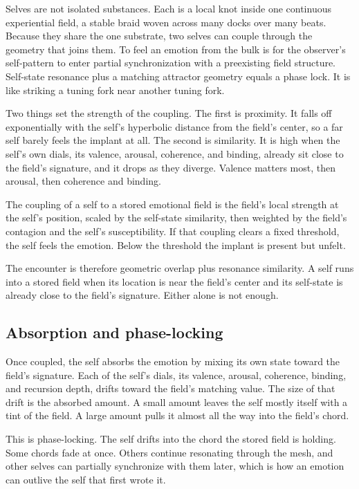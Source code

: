 Selves are not isolated substances. Each is a local knot inside one continuous experiential field, a stable braid woven across many docks over many beats. Because they share the one substrate, two selves can couple through the geometry that joins them. To feel an emotion from the bulk is for the observer's self-pattern to enter partial synchronization with a preexisting field structure. Self-state resonance plus a matching attractor geometry equals a phase lock. It is like striking a tuning fork near another tuning fork.

Two things set the strength of the coupling. The first is proximity. It falls off exponentially with the self's hyperbolic distance from the field's center, so a far self barely feels the implant at all. The second is similarity. It is high when the self's own dials, its valence, arousal, coherence, and binding, already sit close to the field's signature, and it drops as they diverge. Valence matters most, then arousal, then coherence and binding.

\begin{definition}
The coupling of a self to a stored emotional field is the field's local strength at the self's position, scaled by the self-state similarity, then weighted by the field's contagion and the self's susceptibility. If that coupling clears a fixed threshold, the self feels the emotion. Below the threshold the implant is present but unfelt.
\end{definition}

The encounter is therefore geometric overlap plus resonance similarity. A self runs into a stored field when its location is near the field's center and its self-state is already close to the field's signature. Either alone is not enough.

\subsection{Absorption and phase-locking}

Once coupled, the self absorbs the emotion by mixing its own state toward the field's signature. Each of the self's dials, its valence, arousal, coherence, binding, and recursion depth, drifts toward the field's matching value. The size of that drift is the absorbed amount. A small amount leaves the self mostly itself with a tint of the field. A large amount pulls it almost all the way into the field's chord.

This is phase-locking. The self drifts into the chord the stored field is holding. Some chords fade at once. Others continue resonating through the mesh, and other selves can partially synchronize with them later, which is how an emotion can outlive the self that first wrote it.

